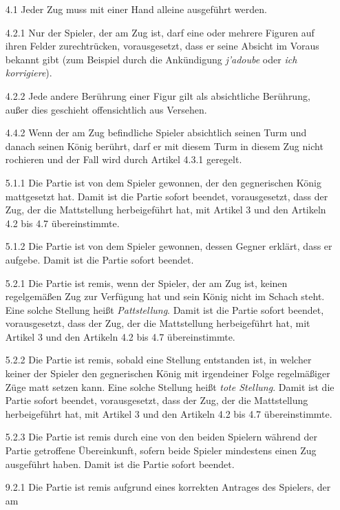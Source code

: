 \documentclass[
  a4paper,
  justified,
  nobib,
]{tufte-handout}
\begin{document}
\begin{enumerate}
  \item[4.1] Jeder Zug muss mit einer Hand alleine ausgeführt werden.
  \item[4.2.1] Nur der Spieler, der am Zug ist, darf eine oder mehrere Figuren auf ihren
    Felder zurechtrücken, vorausgesetzt, dass er seine Absicht im Voraus bekannt gibt (zum
    Beispiel durch die Ankündigung \emph{j’adoube} oder \emph{ich korrigiere}).
  \item[4.2.2] Jede andere Berührung einer Figur gilt als absichtliche Berührung, außer
    dies geschieht offensichtlich aus Versehen.
  \item[4.4.2] Wenn der am Zug befindliche Spieler absichtlich seinen Turm und danach
    seinen König berührt, darf er mit diesem Turm in diesem Zug nicht rochieren und der
    Fall wird durch Artikel 4.3.1 geregelt.
  \item[5.1.1] Die Partie ist von dem Spieler gewonnen, der den gegnerischen König
    mattgesetzt hat.
    Damit ist die Partie sofort beendet, vorausgesetzt, dass der Zug, der die Mattstellung
    herbeigeführt hat, mit Artikel 3 und den Artikeln 4.2 bis 4.7
    übereinstimmte.
  \item[5.1.2] Die Partie ist von dem Spieler gewonnen, dessen Gegner erklärt, dass er
    aufgebe. Damit ist die Partie sofort beendet.
  \item[5.2.1] Die Partie ist remis, wenn der Spieler, der am Zug ist, keinen regelgemäßen
    Zug zur Verfügung hat und sein König nicht im Schach steht. Eine solche Stellung heißt
    \emph{Pattstellung}.
    Damit ist die Partie sofort beendet, vorausgesetzt, dass der Zug, der die Mattstellung
    herbeigeführt hat, mit Artikel 3 und den Artikeln 4.2 bis 4.7 übereinstimmte.
  \item[5.2.2] Die Partie ist remis, sobald eine Stellung entstanden ist, in welcher
    keiner der Spieler den gegnerischen König mit irgendeiner Folge regelmäßiger Züge matt
    setzen kann. Eine solche Stellung heißt \emph{tote Stellung}.
    Damit ist die Partie sofort beendet, vorausgesetzt, dass der Zug, der die Mattstellung
    herbeigeführt hat, mit Artikel 3 und den Artikeln 4.2 bis 4.7 übereinstimmte.
  \item[5.2.3] Die Partie ist remis durch eine von den beiden Spielern während der Partie
    getroffene Übereinkunft, sofern beide Spieler mindestens einen Zug ausgeführt haben.
    Damit ist die Partie sofort beendet.
  \item[9.2.1] Die Partie ist remis aufgrund eines korrekten Antrages des Spielers, der am

\end{enumerate}
\end{document}
